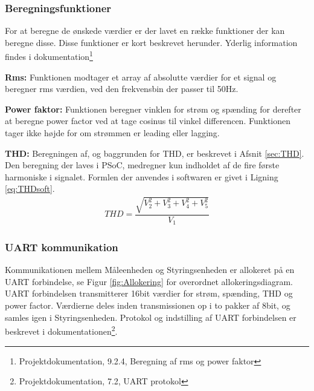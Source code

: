 
\subsubsection{Beregningsfunktioner}
For at beregne de ønskede værdier er der lavet en række funktioner der kan beregne disse. Disse funktioner er kort beskrevet herunder. Yderlig information findes i dokumentation\footnote{Projektdokumentation, 9.2.4, Beregning af rms og power faktor}

\textbf{Rms:}
Funktionen modtager et array af absolutte værdier for et signal og beregner rms værdien, ved den frekvensbin der passer til 50Hz.

\textbf{Power faktor:}
Funktionen beregner vinklen for strøm og spænding for derefter at beregne power factor ved at tage cosinus til vinkel differencen. Funktionen tager ikke højde for om strømmen er leading eller lagging.

\textbf{THD:}
Beregningen af, og baggrunden for THD, er beskrevet i Afsnit \ref{sec:THD}. Den beregning der laves i PSoC, medregner kun indholdet af de fire første harmoniske i signalet. Formlen der anvendes i softwaren er givet i Ligning \ref{eq:THDsoft}.
\begin{align}
\label{eq:THDsoft}
THD = \dfrac{\sqrt{V_2^{2}+V_3^{2}+V_4^{2}+V_5^{2}}}{V_{1}}
\end{align}
 

\subsubsection{UART kommunikation}
Kommunikationen mellem Måleenheden og Styringsenheden er allokeret på en UART forbindelse, se Figur \ref{fig:Allokering} for overordnet allokeringsdiagram. UART forbindelsen transmitterer 16bit værdier for strøm, spænding, THD og power factor. Værdierne deles inden transmissionen op i to pakker af 8bit, og samles igen i Styringsenheden. Protokol og indstilling af UART forbindelsen er beskrevet i dokumentationen\footnote{Projektdokumentation, 7.2, UART protokol}.




